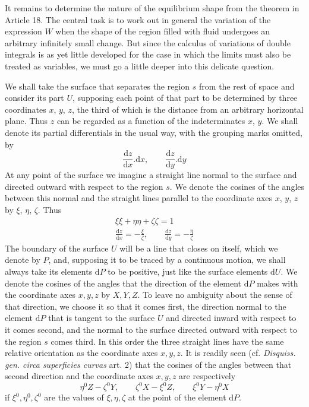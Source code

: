 It remains to determine the nature of the equilibrium shape from the theorem in Article 18. The central task is to work out in general the variation of the expression $W$ when the shape of the region filled with fluid undergoes an arbitrary infinitely small change. But since the calculus of variations of double integrals is as yet little developed for the case in which the limits must also be treated as variables, we must go a little deeper into this delicate question.

We shall take the surface that separates the region $s$ from the rest of space and consider its part $U$, supposing each point of that part to be determined by three coordinates $x$, $y$, $z$, the third of which is the distance from an arbitrary horizontal plane. Thus $z$ can be regarded as a function of the indeterminates $x$, $y$. We shall denote its partial differentials in the usual way, with the grouping marks omitted, by
\[
\frac{\mathrm{d}z}{\mathrm{d}x}.\mathrm{d}x,\qquad\frac{\mathrm{d}z}{\mathrm{d}y}.\mathrm{d}y
\]
At any point of the surface we imagine a straight line normal to the surface and directed outward with respect to the region $s$. We denote the cosines of the angles between this normal and the straight lines parallel to the coordinate axes $x$, $y$, $z$ by $\xi$, $\eta$, $\zeta$. Thus
\[
\begin{gathered}
\xi\xi+\eta\eta+\zeta\zeta=1\\
\frac{\mathrm{d}z}{\mathrm{d}x}=-\frac{\xi}{\zeta},\qquad\frac{\mathrm{d}z}{\mathrm{d}y}=-\frac{\eta}{\zeta}
\end{gathered}
\]
The boundary of the surface $U$ will be a line that closes on itself, which we denote by $P$, and, supposing it to be traced by a continuous motion, we shall always take its elements $\mathrm{d}P$ to be positive, just like the surface elements $\mathrm{d}U$. We denote the cosines of the angles that the direction of the element $\mathrm{d}P$ makes with the coordinate axes $x,y,z$ by $X,Y,Z$. To leave no ambiguity about the sense of that direction, we choose it so that it comes first, the direction normal to the element $\mathrm{d}P$ that is tangent to the surface $U$ and directed inward with respect to it comes second, and the normal to the surface directed outward with respect to the region $s$ comes third. In this order the three straight lines have the same relative orientation as the coordinate axes $x,y,z$. It is readily seen (cf. \textit{Disquiss. gen. circa superficies curvas} art. 2) that the cosines of the angles between that second direction and the coordinate axes $x,y,z$ are respectively
\[
\eta^0Z-\zeta^0Y,\qquad \zeta^0X-\xi^0Z,\qquad \xi^0Y-\eta^0X
\]
if $\xi^0,\eta^0,\zeta^0$ are the values of $\xi,\eta,\zeta$ at the point of the element $\mathrm{d}P$.

